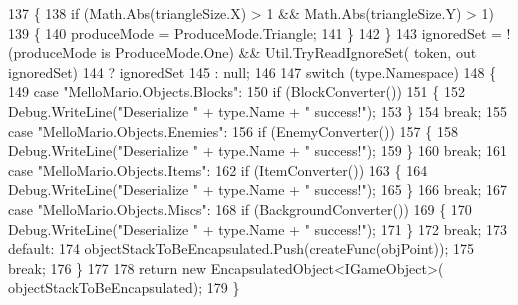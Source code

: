 \begin{DoxyCode}
137             \{
138                 \textcolor{keywordflow}{if} (Math.Abs(triangleSize.X) > 1 && Math.Abs(triangleSize.Y) > 1)
139                 \{
140                     produceMode = ProduceMode.Triangle;
141                 \}
142             \}
143             ignoredSet = !(produceMode is ProduceMode.One) && Util.TryReadIgnoreSet(
      token, out ignoredSet)
144                 ? ignoredSet
145                 : null;
146 
147             \textcolor{keywordflow}{switch} (type.Namespace)
148             \{
149                 \textcolor{keywordflow}{case} \textcolor{stringliteral}{"MelloMario.Objects.Blocks"}:
150                     \textcolor{keywordflow}{if} (BlockConverter())
151                     \{
152                         Debug.WriteLine(\textcolor{stringliteral}{"Deserialize "} + type.Name + \textcolor{stringliteral}{" success!"});
153                     \}
154                     \textcolor{keywordflow}{break};
155                 \textcolor{keywordflow}{case} \textcolor{stringliteral}{"MelloMario.Objects.Enemies"}:
156                     \textcolor{keywordflow}{if} (EnemyConverter())
157                     \{
158                         Debug.WriteLine(\textcolor{stringliteral}{"Deserialize "} + type.Name + \textcolor{stringliteral}{" success!"});
159                     \}
160                     \textcolor{keywordflow}{break};
161                 \textcolor{keywordflow}{case} \textcolor{stringliteral}{"MelloMario.Objects.Items"}:
162                     \textcolor{keywordflow}{if} (ItemConverter())
163                     \{
164                         Debug.WriteLine(\textcolor{stringliteral}{"Deserialize "} + type.Name + \textcolor{stringliteral}{" success!"});
165                     \}
166                     \textcolor{keywordflow}{break};
167                 \textcolor{keywordflow}{case} \textcolor{stringliteral}{"MelloMario.Objects.Miscs"}:
168                     \textcolor{keywordflow}{if} (BackgroundConverter())
169                     \{
170                         Debug.WriteLine(\textcolor{stringliteral}{"Deserialize "} + type.Name + \textcolor{stringliteral}{" success!"});
171                     \}
172                     \textcolor{keywordflow}{break};
173                 \textcolor{keywordflow}{default}:
174                     objectStackToBeEncapsulated.Push(createFunc(objPoint));
175                     \textcolor{keywordflow}{break};
176             \}
177 
178             \textcolor{keywordflow}{return} \textcolor{keyword}{new} EncapsulatedObject<IGameObject>(
      objectStackToBeEncapsulated);
179         \}
\end{DoxyCode}
